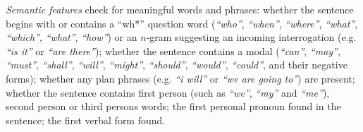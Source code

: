 \textit{Semantic features} check for meaningful words and phrases:
%
whether the sentence begins with or contains a ``wh*'' question word  (\textit{``who''}, \textit{``when''}, \textit{``where''}, \textit{``what''}, \textit{``which''}, \textit{``what''}, \textit{``how''}) or an $n$-gram suggesting an incoming interrogation (e.g. \textit{``is it''} or \textit{``are there''}); %
whether the sentence contains a modal (\textit{``can''}, \textit{``may''}, \textit{``must''}, \textit{``shall''}, \textit{``will''}, \textit{``might''}, \textit{``should''}, \textit{``would''}, \textit{``could''}, and their negative forms);
whether any plan phrases (e.g. \textit{``i will''} or \textit{``we are going to''}) are present;
whether the sentence contains first person (such as \textit{``we''}, \textit{``my''} and \textit{``me''}), second person or third persons words; %
the first personal pronoun found in the sentence;
the first verbal form found.%

